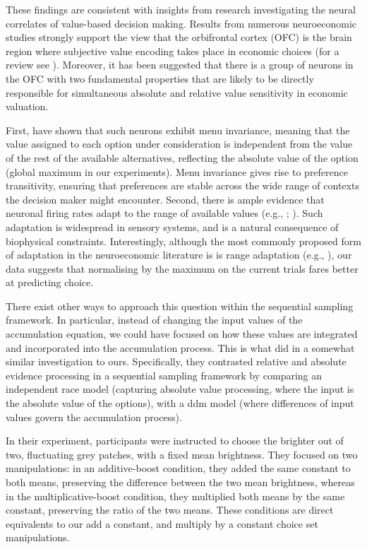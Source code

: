 \documentclass[11pt,a4paper]{article}
\begin{document}
These findings are consistent with insights from research investigating the neural correlates of value-based decision making. Results from numerous neuroeconomic studies strongly support the view that the orbifrontal cortex (OFC) is the brain region where subjective value encoding takes place in economic choices (for a review see ). Moreover, it has been suggested that there is a group of neurons in the OFC with two fundamental properties that are likely to be directly responsible for simultaneous absolute and relative value sensitivity in economic valuation.

First,  have shown that such neurons exhibit menu invariance, meaning that the value assigned to each option under consideration is independent from the value of the rest of the available alternatives, reflecting the absolute value of the option (global maximum in our experiments). Menu invariance gives rise to preference transitivity, ensuring that preferences are stable across the wide range of contexts the decision maker might encounter. Second, there is ample evidence that neuronal firing rates adapt to the range of available values (e.g., ; ). Such adaptation is widespread in sensory systems, and is a natural consequence of biophysical constraints. Interestingly, although the most commonly proposed form of adaptation in the neuroeconomic literature is is range adaptation (e.g., ), our data suggests that normalising by the maximum on the current trials fares better at predicting choice.

There exist other ways to approach this question within the sequential sampling framework. In particular, instead of changing the input values of the accumulation equation, we could have focused on how these values are integrated and incorporated into the accumulation process. This is what  did in a somewhat similar investigation to ours. Specifically, they contrasted relative and absolute evidence processing in a sequential sampling framework by comparing an independent race model (capturing absolute value processing, where the input is the absolute value of the options), with a ddm model (where differences of input values govern the accumulation process). 

In their experiment, participants were instructed to choose the brighter out of two, fluctuating grey patches, with a fixed mean brightness. They focused on two manipulations: in an additive-boost condition, they added the same constant to both means, preserving the difference between the two mean brightness, whereas in the multiplicative-boost condition, they multiplied both means by the same constant, preserving the ratio of the two means. These conditions are direct equivalents to our add a constant, and multiply by a constant choice set manipulations.
\end{document}
